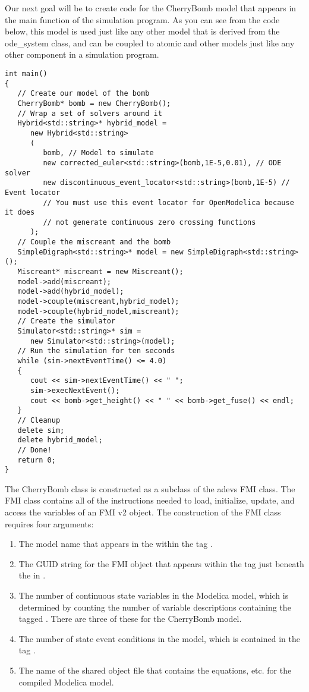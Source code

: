 Our next goal will be to create code for the CherryBomb model that appears in the main function of the simulation program. As you can see from the code below, this model is used just like any other model that is derived from the ode\_system class, and can be coupled to atomic and other models just like any other component in a simulation program.
\begin{verbatim}
int main()
{
   // Create our model of the bomb
   CherryBomb* bomb = new CherryBomb();
   // Wrap a set of solvers around it
   Hybrid<std::string>* hybrid_model =
      new Hybrid<std::string>
      (
         bomb, // Model to simulate
         new corrected_euler<std::string>(bomb,1E-5,0.01), // ODE solver
         new discontinuous_event_locator<std::string>(bomb,1E-5) // Event locator
         // You must use this event locator for OpenModelica because it does
         // not generate continuous zero crossing functions
      );
   // Couple the miscreant and the bomb
   SimpleDigraph<std::string>* model = new SimpleDigraph<std::string>();
   Miscreant* miscreant = new Miscreant();
   model->add(miscreant);
   model->add(hybrid_model);
   model->couple(miscreant,hybrid_model);
   model->couple(hybrid_model,miscreant);
   // Create the simulator
   Simulator<std::string>* sim =
      new Simulator<std::string>(model);
   // Run the simulation for ten seconds
   while (sim->nextEventTime() <= 4.0)
   {
      cout << sim->nextEventTime() << " ";
      sim->execNextEvent();
      cout << bomb->get_height() << " " << bomb->get_fuse() << endl;
   }
   // Cleanup
   delete sim;
   delete hybrid_model;
   // Done!
   return 0;
}
\end{verbatim}

The CherryBomb class is constructed as a subclass of the adevs FMI class. The FMI class contains all of the instructions needed to load, initialize, update, and access the variables of an FMI v2 object. The construction of the FMI class requires four arguments:
\begin{enumerate}
\item The model name that appears in the  within the tag .
\item The GUID string for the FMI object that appears within the tag  just beneath the  in .
\item The number of continuous state variables in the Modelica model, which is determined by counting the number of variable descriptions containing the tagged . There are three of these for the CherryBomb model.
\item The number of state event conditions in the model, which is contained in the tag . 
\item The name of the shared object file that contains the equations, etc. for the compiled Modelica model.
\end{enumerate}


